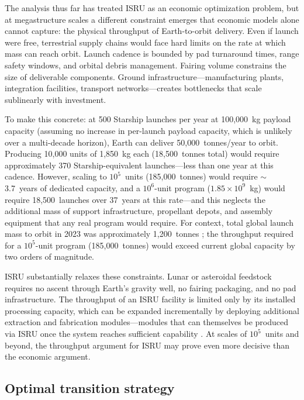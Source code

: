 \documentclass[preprint,12pt]{elsarticle}
\begin{document}
The analysis thus far has treated ISRU as an economic optimization problem, but at megastructure scales a different constraint emerges that economic models alone cannot capture: the physical throughput of Earth-to-orbit delivery. Even if launch were free, terrestrial supply chains would face hard limits on the rate at which mass can reach orbit. Launch cadence is bounded by pad turnaround times, range safety windows, and orbital debris management. Fairing volume constrains the size of deliverable components. Ground infrastructure---manufacturing plants, integration facilities, transport networks---creates bottlenecks that scale sublinearly with investment.

To make this concrete: at 500 Starship launches per year at 100{,}000~kg payload capacity (assuming no increase in per-launch payload capacity, which is unlikely over a multi-decade horizon), Earth can deliver 50{,}000~tonnes/year to orbit. Producing 10{,}000 units of 1{,}850~kg each (18{,}500~tonnes total) would require approximately 370 Starship-equivalent launches---less than one year at this cadence. However, scaling to $10^5$~units (185{,}000~tonnes) would require $\sim$3.7~years of dedicated capacity, and a $10^6$-unit program ($1.85 \times 10^9$~kg) would require 18{,}500~launches over 37~years at this rate---and this neglects the additional mass of support infrastructure, propellant depots, and assembly equipment that any real program would require. For context, total global launch mass to orbit in 2023 was approximately 1{,}200~tonnes \cite{jones2022}; the throughput required for a $10^5$-unit program (185{,}000~tonnes) would exceed current global capacity by two orders of magnitude.

ISRU substantially relaxes these constraints. Lunar or asteroidal feedstock requires no ascent through Earth's gravity well, no fairing packaging, and no pad infrastructure. The throughput of an ISRU facility is limited only by its installed processing capacity, which can be expanded incrementally by deploying additional extraction and fabrication modules---modules that can themselves be produced via ISRU once the system reaches sufficient capability \cite{metzger2013}. At scales of $10^5$~units and beyond, the throughput argument for ISRU may prove even more decisive than the economic argument.

\subsection{Optimal transition strategy}
\end{document}
